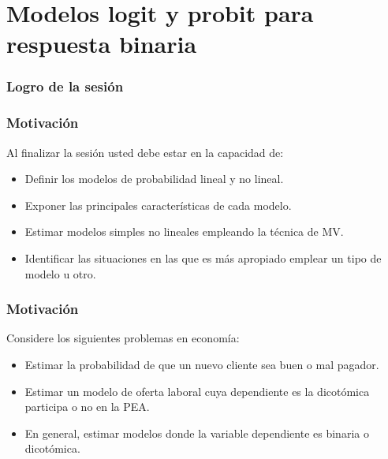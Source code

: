 \section[Logit y Probit]{Modelos logit y probit para respuesta binaria}

\subsubsection{Logro de la sesión}
\begin{frame}[fragile]
	\frametitle{Motivación}
	
	Al finalizar la sesión usted debe estar en la capacidad de:
	
	\begin{itemize}
		\item Definir los modelos de probabilidad lineal y no lineal.
		
		\item Exponer las principales características de cada modelo.
		
		\item Estimar modelos simples no lineales empleando la técnica de MV.
		
		\item Identificar las situaciones en las que es más apropiado
		emplear un tipo de modelo u otro.
	\end{itemize}
\end{frame}

\subsubsection{Motivación}

\begin{frame}[fragile]
	
	Considere los siguientes problemas en economía:
	
	\begin{itemize}
		\item Estimar la probabilidad de que un nuevo cliente sea buen
		o mal pagador.
		
		
		
		\item Estimar un modelo de oferta laboral cuya dependiente es la dicotómica
		participa o no en la PEA.
		
		\item En general, estimar modelos donde la variable dependiente es binaria
		o dicotómica.
	\end{itemize}
\end{frame}

